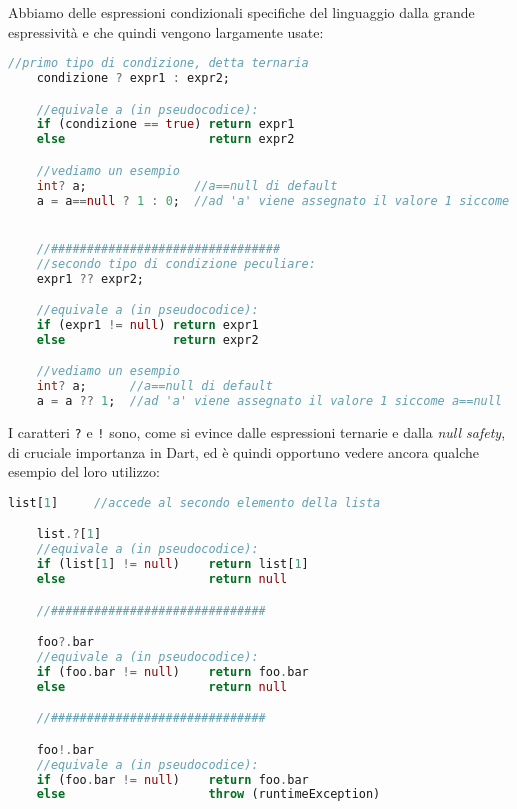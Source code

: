 Abbiamo delle espressioni condizionali specifiche del linguaggio dalla grande espressività e che quindi vengono largamente usate:
\begin{lstlisting}[language=dart, firstnumber=1,caption={Dart espressioni ternarie}]
    //primo tipo di condizione, detta ternaria
    condizione ? expr1 : expr2;

    //equivale a (in pseudocodice):
    if (condizione == true) return expr1
    else                    return expr2

    //vediamo un esempio
    int? a;               //a==null di default
    a = a==null ? 1 : 0;  //ad 'a' viene assegnato il valore 1 siccome a==null


    //################################
    //secondo tipo di condizione peculiare:
    expr1 ?? expr2;

    //equivale a (in pseudocodice):
    if (expr1 != null) return expr1
    else               return expr2

    //vediamo un esempio
    int? a;      //a==null di default
    a = a ?? 1;  //ad 'a' viene assegnato il valore 1 siccome a==null
\end{lstlisting}

I caratteri \verb+?+ e \verb+!+ sono, come si evince dalle espressioni ternarie e dalla \textit{null safety}, di cruciale importanza in Dart, ed è quindi opportuno vedere ancora qualche esempio del loro utilizzo:
\begin{lstlisting}[language=dart, firstnumber=1,caption={Dart operatori '?' e '!'}]
    list[1]     //accede al secondo elemento della lista

    list.?[1]
    //equivale a (in pseudocodice):
    if (list[1] != null)    return list[1]
    else                    return null

    //##############################

    foo?.bar 
    //equivale a (in pseudocodice):
    if (foo.bar != null)    return foo.bar
    else                    return null

    //##############################

    foo!.bar
    //equivale a (in pseudocodice):
    if (foo.bar != null)    return foo.bar
    else                    throw (runtimeException)
\end{lstlisting}

